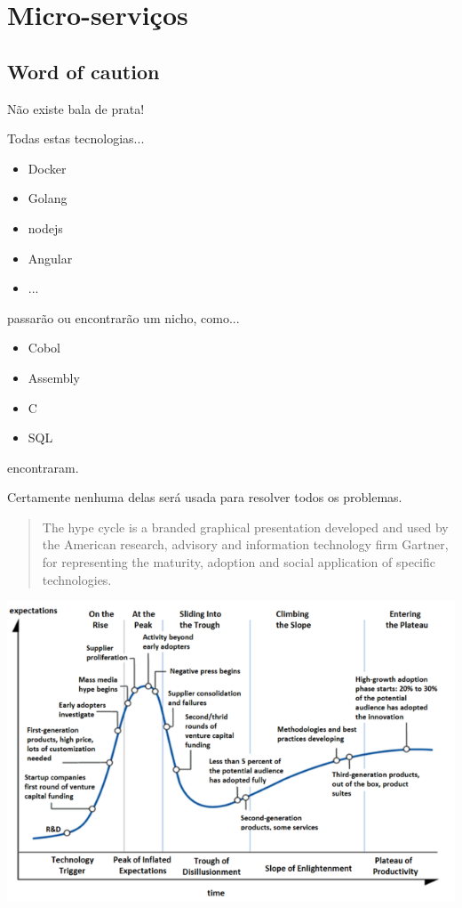 \section{Micro-serviços}

\subsection{Word of caution}
\begin{frame}
Não existe bala de prata!
\end{frame}



\begin{frame}
Todas estas tecnologias...
\begin{itemize}
	\item Docker
	\item Golang
	\item nodejs
	\item Angular
	\item ...
\end{itemize}
passarão ou encontrarão um nicho, como...
\begin{itemize}
	\item Cobol
	\item Assembly
	\item C
	\item SQL
\end{itemize}
encontraram.

Certamente nenhuma delas será usada para resolver todos os problemas.
\end{frame}


\begin{frame}
\begin{quotation}
	The hype cycle is a branded graphical presentation developed and used by the American research, advisory and information technology firm Gartner, for representing the maturity, adoption and social application of specific technologies.
\end{quotation}

\includegraphics[width=.7\textwidth]{images/gartner-hype-cycle-overview}
\end{frame}

